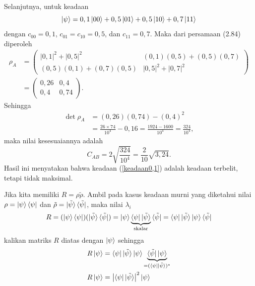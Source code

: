 Selanjutnya, untuk keadaan
\begin{equation}
	\ket{\psi}=0,1\ket{00}+0,5\ket{01}+0,5\ket{10}+0,7\ket{11} \label{keadaan0,1}
\end{equation}
dengan $c_{00}=0,1$, $c_{01}=c_{10}=0,5$, dan $c_{11}=0,7$. Maka dari persamaan (2.84) diperoleh
\begin{equation}
	\begin{aligned}
		\rho_A
		&=
		\begin{pmatrix}
			|0,1|^2+|0,5|^2&(0,1)(0,5)+(0,5)(0,7)\\
			(0,5)(0,1)+(0,7)(0,5)&|0,5|^2+|0,7|^2
		\end{pmatrix}\\
		&=
		\begin{pmatrix}
			0,26&0,4\\
			0,4&0,74
		\end{pmatrix}.
	\end{aligned}
\end{equation}
Sehingga
\begin{equation}
	\begin{aligned}
		\det\rho_{A}
		&=(0,26)(0,74)-(0,4)^2\\
		&=\frac{26\times74}{10^4}-0,16=\frac{1924-1600}{10^4}=\frac{324}{10^4},
	\end{aligned}
\end{equation}
maka nilai kesesuaiannya adalah
\begin{equation}
	C_{AB}=2\sqrt{\frac{324}{10^4}}=\frac{2}{10}\sqrt{3,24}.
\end{equation}
Hasil ini menyatakan bahwa keadaan (\ref{keadaan0,1}) adalah keadaan terbelit, tetapi tidak maksimal.
\par
Jika kita memiliki $R = \rho \tilde{\rho}$. Ambil pada kasus keadaan murni yang diketahui nilai $\rho = \ket{\psi}\bra{\psi}$ dan $\tilde{\rho} = \ket{\tilde{\psi}}\bra{\tilde{\psi}}$, maka nilai $\lambda_i$
\begin{align*}
	R = (\ket{\psi}\bra{\psi})(\ket{\tilde{\psi}}\bra{\tilde{\psi}}) = \ket{\psi} \underbrace{\bra{\psi} \ket{\tilde{\psi}}}_{\text{skalar}} \bra{\tilde{\psi}} = \bra{\psi} \ket{\tilde{\psi}} \ket{\psi} \bra{\tilde{\psi}} 
\end{align*}
kalikan matriks $R$ diatas dengan $\ket{\psi}$ sehingga
\begin{align*}
	R\ket{\psi} & = \bra{\psi} \ket{\tilde{\psi}} \ket{\psi} \underbrace{\bra{\tilde{\psi}} \ket{\psi}}_{=(\bra{\psi}\ket{\tilde{\psi}})^*}\\
	R\ket{\psi} & = \left|\bra{\psi} \ket{\tilde{\psi}}\right|^2  \ket{\psi} \\
\end{align*}
